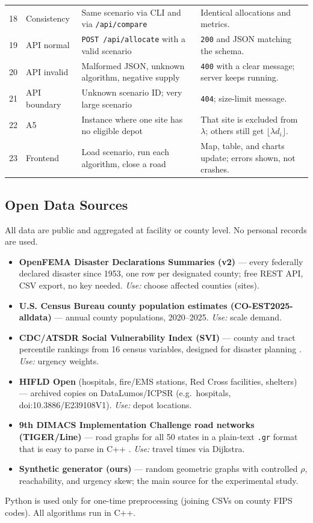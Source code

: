 \documentclass[11pt]{article}
\begin{document}
{\begin{xltabular}{\textwidth}{@{}c l X X@{}}
18 & Consistency & Same scenario via CLI and via \texttt{/api/compare} & Identical allocations and metrics.\\
19 & API normal & \texttt{POST /api/allocate} with a valid scenario & \texttt{200} and JSON matching the schema.\\
20 & API invalid & Malformed JSON, unknown algorithm, negative supply & \texttt{400} with a clear message; server keeps running.\\
21 & API boundary & Unknown scenario ID; very large scenario & \texttt{404}; size-limit message.\\
22 & A5 & Instance where one site has no eligible depot & That site is excluded from $\lambda$; others still get $\lfloor \lambda d_i\rfloor$.\\
23 & Frontend & Load scenario, run each algorithm, close a road & Map, table, and charts update; errors shown, not crashes.\\
\bottomrule
\end{xltabular}}


\subsection{Open Data Sources}\label{sec:data}
All data are public and aggregated at facility or county level. No personal
records are used.
\begin{itemize}
  \item \textbf{OpenFEMA Disaster Declarations Summaries (v2)} ---
        every federally declared disaster since 1953, one row per designated
        county; free REST API, CSV export, no key needed. \emph{Use:} choose
        affected counties (sites).
  \item \textbf{U.S. Census Bureau county population estimates
        (CO-EST2025-alldata)} --- annual county populations, 2020--2025.
        \emph{Use:} scale demand.
  \item \textbf{CDC/ATSDR Social Vulnerability Index (SVI)} --- county and
        tract percentile rankings from 16 census variables, designed for
        disaster planning \cite{flanagan2011}. \emph{Use:} urgency weights.
  \item \textbf{HIFLD Open} (hospitals, fire/EMS stations, Red Cross
        facilities, shelters) --- archived copies on DataLumos/ICPSR (e.g.\
        hospitals, doi:10.3886/E239108V1). \emph{Use:} depot locations.
  \item \textbf{9th DIMACS Implementation Challenge road networks
        (TIGER/Line)} --- road graphs for all 50 states in a plain-text
        \texttt{.gr} format that is easy to parse in C++ \cite{dimacs2009}.
        \emph{Use:} travel times via Dijkstra.
  \item \textbf{Synthetic generator (ours)} --- random geometric graphs with
        controlled $\rho$, reachability, and urgency skew; the main source
        for the experimental study.
\end{itemize}
Python is used only for one-time preprocessing (joining CSVs on county FIPS
codes). All algorithms run in C++.
\end{document}

